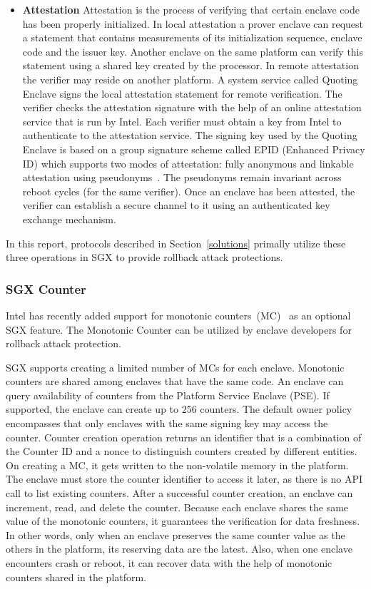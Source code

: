 \begin{itemize}
	\item \textbf{Attestation} Attestation is the process of verifying that certain enclave code has been properly initialized. In local attestation a prover enclave can request a statement that contains measurements of its initialization sequence, enclave code and the issuer key. Another enclave on the same platform can verify this statement using a shared key created by the processor. In remote attestation the verifier may reside on another platform. A system service called Quoting Enclave signs the local attestation statement for remote verification. The verifier checks the attestation signature with the help of an online attestation service that is run by Intel. Each verifier must obtain a key from Intel to authenticate to the attestation service. The signing key used by the Quoting Enclave is based on a group signature scheme called EPID (Enhanced Privacy ID) which supports two modes of attestation: fully anonymous and linkable attestation using pseudonyms~\cite{}. The pseudonyms remain invariant across reboot cycles (for the same verifier). Once an enclave has been attested, the verifier can establish a secure channel to it using an authenticated key exchange mechanism.

\end{itemize}

In this report, protocols described in Section~\ref{solutions} primally utilize these three operations in SGX to provide rollback attack protections.

\subsubsection{SGX Counter}

Intel has recently added support for monotonic counters~(MC)~\cite{} as an optional SGX feature. The Monotonic Counter can be utilized by enclave developers for rollback attack protection. 

SGX supports creating a limited number of MCs for each enclave. Monotonic counters are shared among enclaves that have the same code. An enclave can query availability of counters from the Platform Service Enclave (PSE). If supported, the enclave can create up to 256 counters. The default owner policy encompasses that only enclaves with the same signing key may access the counter. Counter creation operation returns an identifier that is a combination of the Counter ID and a nonce to distinguish counters created by different entities. On creating a MC, it gets written to the non-volatile memory in the platform. The enclave must store the counter identifier to access it later, as there is no API call to list existing counters. After a successful counter creation, an enclave can increment, read, and delete the counter. Because each enclave shares the same value of the monotonic counters, it guarantees the verification for data freshness. In other words, only when an enclave preserves the same counter value as the others in the platform, its reserving data are the latest. Also, when one enclave encounters crash or reboot, it can recover data with the help of monotonic counters shared in the platform. 

